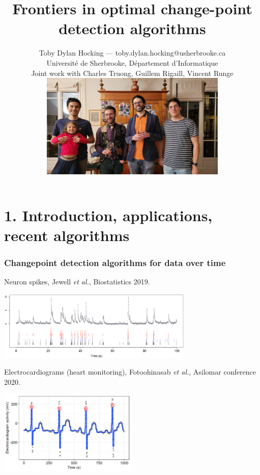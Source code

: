 \documentclass{beamer}
\begin{document}
\title{
  Frontiers in optimal change-point detection algorithms
}

\author{
  Toby Dylan Hocking --- toby.dylan.hocking@usherbrooke.ca\\ 
  Université de Sherbrooke, Département d'Informatique\\
  Joint work with Charles Truong, Guillem Rigaill, Vincent Runge\\
  \includegraphics[height=5cm]{2025-01-photo-charles-toby-guillem-vincent.jpg}
}

\date{}

\maketitle

\section{1. Introduction, applications, recent algorithms} 
\begin{frame}
  \frametitle{Changepoint detection algorithms for data over time}
  Neuron spikes, Jewell \emph{et al.}, Biostatistics 2019.

  \includegraphics[width=0.7\textwidth]{intro-neuroscience} 

  Electrocardiograms (heart monitoring), 
  Fotoohinasab \emph{et al.}, 
  Asilomar conference 2020.

  \includegraphics[width=0.5\textwidth]{intro-ecg} 

\end{frame}
\end{document}
